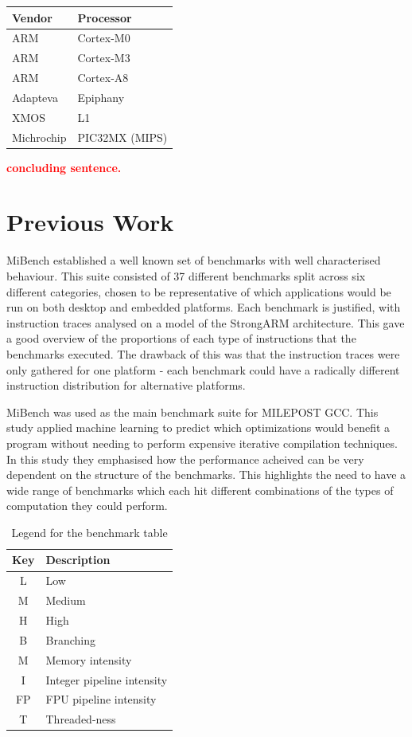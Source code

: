 \documentclass[twocolumn]{article}
\newcommand{\nsection}[1]{\section{\bfseries #1}}
\newcommand{\todo}[1]{\textbf{\textcolor{red}{#1}}}
\begin{document}
\begin{center}
	\begin{tabular}{l l}
		Vendor  & Processor \\
		\hline
		ARM		& Cortex-M0 \\
		ARM		& Cortex-M3 \\
		ARM 	& Cortex-A8 \\
		Adapteva& Epiphany \\
		XMOS	& L1 \\
		Michrochip & PIC32MX (MIPS) \\
	\end{tabular}
\end{center}

\todo{concluding sentence.}

\nsection{Previous Work}

MiBench established a well known set of benchmarks with well characterised behaviour. This suite consisted of 37 different benchmarks split across six different categories, chosen to be representative of which applications would be run on both desktop and embedded platforms. Each benchmark is justified, with instruction traces analysed on a model of the StrongARM architecture. This gave a good overview of the proportions of each type of instructions that the benchmarks executed. The drawback of this was that the instruction traces were only gathered for one platform - each benchmark could have a radically different instruction distribution for alternative platforms.

MiBench was used as the main benchmark suite for MILEPOST GCC\cite{Fursin2011}. This study applied machine learning to predict which optimizations would benefit a program without needing to perform expensive iterative compilation techniques. In this study they emphasised how the performance acheived can be very dependent on the structure of the benchmarks. This highlights the need to have a wide range of benchmarks which each hit different combinations of the types of computation they could perform.

\begin{table}[t]
\centering
	\begin{tabular}{c l}
		Key & Description \\
		\hline
		L	&	Low \\
		M	&	Medium \\
		H	&	High \\
		\hline
		B	&	Branching \\
		M	&	Memory intensity \\
		I	&	Integer pipeline intensity \\
		FP	&	FPU pipeline intensity \\
		T	&	Threaded-ness \\
	\end{tabular}
	\caption{Legend for the benchmark table}
	\label{BenchmarkLegend}
\end{table}
\end{document}
